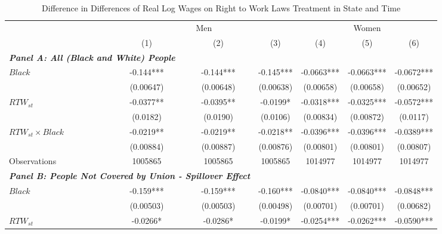 \begin{table}[ht!]\centering
\def\sym#1{\ifmmode^{#1}\else\(^{#1}\)\fi}
\caption{Difference in Differences of Real Log Wages on Right to Work Laws Treatment in State and Time}\label{tab:wagstagdid}
\fontsize{10}{11}\selectfont
\begin{tabular}{l*{6}{c}}
\hline
&\multicolumn{3}{c}{Men}                        &\multicolumn{3}{c}{Women}                      \\\cmidrule(lr){2-4}\cmidrule(lr){5-7}
&\multicolumn{1}{c}{(1)}   &\multicolumn{1}{c}{(2)}   &\multicolumn{1}{c}{(3)}   &\multicolumn{1}{c}{(4)}   &\multicolumn{1}{c}{(5)}   &\multicolumn{1}{c}{(6)}   \\
\hline
\multicolumn{3}{l}{\linebreak \textbf{\textit{Panel A: All (Black and White) People}}} \\
$ Black $           &      -0.144***&      -0.144***&      -0.145***&     -0.0663***&     -0.0663***&     -0.0672***\\
&   (0.00647)   &   (0.00648)   &   (0.00638)   &   (0.00658)   &   (0.00658)   &   (0.00652)   \\
[1em]
$ RTW_{st} $      &     -0.0377** &     -0.0395** &     -0.0199*  &     -0.0318***&     -0.0325***&     -0.0572***\\
&    (0.0182)   &    (0.0190)   &    (0.0106)   &   (0.00834)   &   (0.00872)   &    (0.0117)   \\
[1em]
$ RTW_{st} \times Black $&     -0.0219** &     -0.0219** &     -0.0218** &     -0.0396***&     -0.0396***&     -0.0389***\\
&   (0.00884)   &   (0.00887)   &   (0.00876)   &   (0.00801)   &   (0.00801)   &   (0.00807)   \\
\hline
Observations        &     1005865   &     1005865   &     1005865   &     1014977   &     1014977   &     1014977   \\
\hline
\multicolumn{3}{l}{\linebreak \textbf{\textit{Panel B: People Not Covered by Union - Spillover Effect}}} \\
$ Black $           &      -0.159***&      -0.159***&      -0.160***&     -0.0840***&     -0.0840***&     -0.0848***\\
&   (0.00503)   &   (0.00503)   &   (0.00498)   &   (0.00701)   &   (0.00701)   &   (0.00682)   \\
[1em]
$ RTW_{st} $      &     -0.0266*  &     -0.0286*  &     -0.0199*  &     -0.0254***&     -0.0262***&     -0.0590***\\

\end{tabular}
\end{table}
